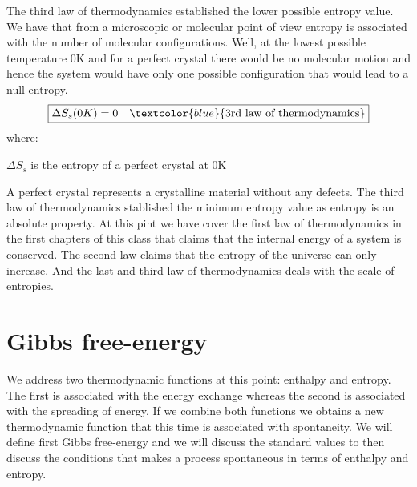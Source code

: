 \documentclass[main.tex]{subfiles}
\newcommand\chapterlabel{entropy}
\begin{document}
\begin{description}
\begin{example}
\end{example}%
\item[\docfilehook{The third law of thermodynamics }{ }] 
The third law of thermodynamics established the lower possible entropy value. We have that from a microscopic or molecular point of view entropy is associated with the number of molecular configurations. Well, at the lowest possible temperature 0K and for a perfect crystal there would be no molecular motion and hence the system would have only one possible configuration that would lead to a null entropy.
\begin{equation}\begin{split}
\boxed{  \Delta S_{s}(0K)=0  \quad \textcolor{blue}{\text{3rd law of thermodynamics}}  }
\label{\chapterlabel:equation6}
\end{split}\end{equation}
where:
\begin{where}
 \item $\Delta S_{s}$   is the entropy of a perfect crystal at 0K
 \end{where}
A perfect crystal represents a crystalline material without any defects. The third law of thermodynamics stablished the minimum entropy value as entropy is an absolute  property. At this pint we have cover the first law of thermodynamics in the first chapters of this class that claims that the internal energy of a system is conserved. The second law claims that the entropy of the universe can only increase. And the last and third law of thermodynamics deals with the scale of entropies.
 
 
\end{description}



\section{Gibbs free-energy}
We address two thermodynamic functions at this point: enthalpy and entropy. The first is associated with the energy exchange whereas the second is associated with the spreading of energy. If we combine both functions we obtains a new thermodynamic function that this time is associated with spontaneity. We will define first Gibbs free-energy and we will discuss the standard values to then discuss the conditions that makes a process spontaneous in terms of enthalpy and entropy.
\sloppy
\end{document}
